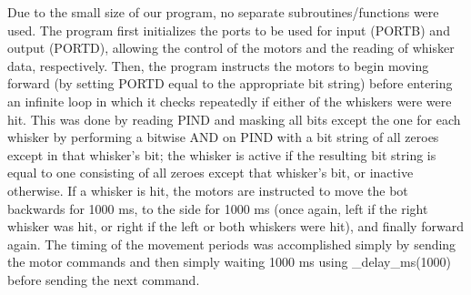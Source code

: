 \documentclass[12pt,letterpaper]{article}
\begin{document}
Due to the small size of our program, no separate subroutines/functions were
used.  The program first initializes the ports to be used for input (PORTB) and
output (PORTD), allowing the control of the motors and the reading of whisker
data, respectively.  Then, the program instructs the motors to begin moving
forward (by setting PORTD equal to the appropriate bit string) before entering
an infinite loop in which it checks repeatedly if either of the whiskers were
were hit.  This was done by reading PIND and masking all bits except the one
for each whisker by performing a bitwise AND on PIND with a bit string of all
zeroes except in that whisker's bit; the whisker is active if the resulting bit
string is equal to one consisting of all zeroes except that whisker's bit, or
inactive otherwise.  If a whisker is hit, the motors are instructed to move the
bot backwards for 1000 ms, to the side for 1000 ms (once again, left if the
right whisker was hit, or right if the left or both whiskers were hit), and
finally forward again.  The timing of the movement periods was accomplished
simply by sending the motor commands and then simply waiting 1000 ms using
\_delay\_ms(1000) before sending the next command.
\end{document}

